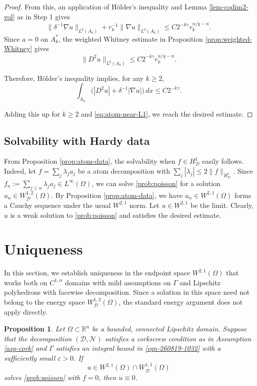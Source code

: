 \documentclass[12pt]{amsart}
\newtheorem{proposition}[theorem]{Proposition}
\numberwithin{equation}{section}
\newcommand{\bR}{\mathbb{R}}
\newcommand\cD{\mathcal{D}}
\newcommand\cN{\mathcal{N}}
\newcommand{\epsi}{\varepsilon}
\begin{document}
\begin{proof}
From this, an application of H\"older's inequality and Lemma \ref{lem-codim2-vol} as in Step 1 gives
\begin{equation}
 \|\delta^{-1}\nabla u\|_{L^q(A_k)}
 +r_k^{-1}\|\nabla u\|_{L^q(A_k)}
 \leq C2^{-k\gamma}r_k^{n/q-n}.
 \label{eq:atom-annular-Lq}
\end{equation}
Since $a=0$ on $A_k^*$, the weighted Whitney estimate in Proposition \ref{prop:weighted-Whitney} gives
\[
 \|D^2u\|_{L^q(A_k)}
 \leq C2^{-k\gamma}r_k^{n/q-n}.
\]

Therefore, H\"older's inequality implies, for any $k \geq 2$,
\begin{equation}
 \int_{A_k}
 \bigl(|D^2u|+\delta^{-1}|\nabla u|\bigr)\,dx
 \leq C2^{-k\gamma}.
 \label{eq:atom-annular-L1}
\end{equation}

Adding this up for $k \geq 2$ and \eqref{eq:atom-near-L1}, we reach the desired estimate.
\end{proof}

\subsection{Solvability with Hardy data}

From Proposition \ref{prop:atom-data}, the solvability when $f \in H^1_\cD$ easily follows. Indeed, let $f = \sum_j \lambda_j a_j$ be a atom decomposition with $\sum_j |\lambda_j| \leq 2 \|f\|_{H^1_\cD}$. Since $f_n := \sum_{j\leq n}\lambda_j a_j \in L^\infty(\Omega)$, we can solve \eqref{prob:poisson} for a solution $u_n \in W^{1,2}_\cD(\Omega)$. By Proposition \ref{prop:atom-data}, we have $u_n \in W^{2,1}(\Omega)$ forms a Cauchy sequence under the usual $W^{2,1}$ norm. Let $u \in W^{2,1}$ be the limit. Clearly, $u$ is a weak solution to \eqref{prob:poisson} and satisfies the desired estimate.


\section{Uniqueness}
\label{sec-uniqueness}

In this section, we establish uniqueness in the endpoint space $W^{2,1}(\Omega)$ that works both on $C^{1,\alpha}$ domains with mild assumptions on $\Gamma$ and Lipschitz polyhedrons with facewise decomposition. Since a solution in this space need not belong to the energy space $W^{1,2}_{\cD}(\Omega)$, the standard energy argument does not apply directly.

\begin{proposition}
 \label{prop:W21-uniqueness}
 Let $\Omega\subset\bR^n$ be a bounded, connected Lipschitz domain. Suppose that the decomposition $(\cD, \cN)$ satisfies a corkscrew condition as in Assumption \ref{asp-cork} and $\Gamma$ satisfies an integral bound in \eqref{eqn-260819-1032} with a sufficiently small $\epsi >0$. If
 \[
  u\in W^{2,1}(\Omega)\cap W^{1,1}_{\cD}(\Omega)
 \]
 solves \eqref{prob:poisson} with $f=0$, then $u\equiv0$.
\end{proposition}
\end{document}
